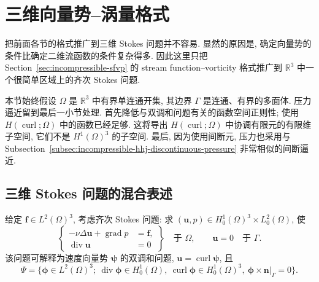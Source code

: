 \section{三维向量势--涡量格式}
\label{sec:incompressible-vector-potential-vorticity}

把前面各节的格式推广到三维 Stokes 问题并不容易.
显然的原因是, 确定向量势的条件比确定二维流函数的条件复杂得多.
因此这里只把 Section~\ref{sec:incompressible-sfvp}
的 stream function--vorticity 格式推广到
$\mathbb R^3$ 中一个很简单区域上的齐次 Stokes 问题.

本节始终假设 $\Omega$ 是 $\mathbb R^3$ 中有界单连通开集,
其边界 $\Gamma$ 是连通、有界的多面体.
压力逼近留到最后一小节处理. 首先降低与双调和问题有关的函数空间正则性;
使用 $H(\operatorname{curl};\Omega)$ 中的函数已经足够.
这将导出 $H(\operatorname{curl};\Omega)$ 中协调有限元的有限维子空间,
它们不是 $H^1(\Omega)^3$ 的子空间.
最后, 因为使用间断元, 压力也采用与
Subsection~\ref{subsec:incompressible-hhj-discontinuous-pressure}
非常相似的间断逼近.

\subsection{三维 Stokes 问题的混合表述}
\label{subsec:incompressible-vector-potential-mixed-formulation}

给定 $\mathbf f\in L^2(\Omega)^3$, 考虑齐次 Stokes 问题:
求 $(\mathbf u,p)\in H_0^1(\Omega)^3\times L_0^2(\Omega)$, 使
\begin{equation}\label{eq:incompressible-vector-potential-stokes}
\left\{
\begin{aligned}
-\nu\Delta\mathbf u+\operatorname{grad}p&=\mathbf f,\\
\operatorname{div}\mathbf u&=0
\end{aligned}
\right\}\quad\text{于 }\Omega,
\qquad
\mathbf u=0\quad\text{于 }\Gamma.
\end{equation}
该问题可解释为速度向量势 $\boldsymbol\psi$ 的双调和问题,
$\mathbf u=\operatorname{curl}\boldsymbol\psi$, 且
\begin{equation}\label{eq:incompressible-vector-potential-space}
\Psi=\{\boldsymbol\phi\in L^2(\Omega)^3;
\ \operatorname{div}\boldsymbol\phi\in H_0^1(\Omega),
\ \operatorname{curl}\boldsymbol\phi\in H_0^1(\Omega)^3,
\ \boldsymbol\phi\times\mathbf n|_\Gamma=0\}.
\end{equation}

